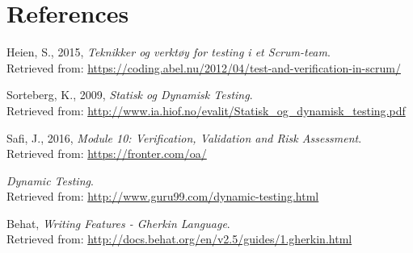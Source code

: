 \chapter*{References}
\begin{thebibliography}{10}

    
    Heien, S., 2015, \textit{Teknikker og verktøy for testing i et Scrum-team}. \\
    \qquad Retrieved from: \url{https://coding.abel.nu/2012/04/test-and-verification-in-scrum/}
    
    Sorteberg, K., 2009, \textit{Statisk og Dynamisk Testing}. \\
    \qquad Retrieved from: \url{http://www.ia.hiof.no/evalit/Statisk_og_dynamisk_testing.pdf}
    
    
    Safi, J., 2016, \textit{Module 10: Verification, Validation and Risk Assessment}. \\
    \qquad Retrieved from: \url{https://fronter.com/oa/}
    
    \textit{Dynamic Testing}. \\
    \qquad Retrieved from: \url{http://www.guru99.com/dynamic-testing.html}
    
    Behat, \textit{Writing Features - Gherkin Language}. \\
    \qquad Retrieved from: \url{http://docs.behat.org/en/v2.5/guides/1.gherkin.html}

    
\end{thebibliography}
    
    
    



